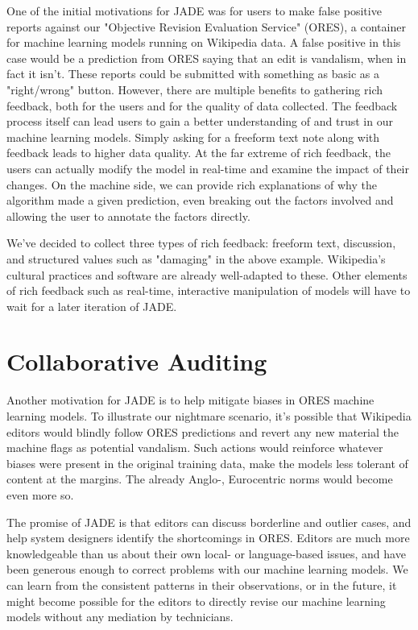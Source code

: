 \documentclass[sigconf, anonymous, review]{acmart}
\begin{document}
One of the initial motivations for JADE was for users to make false positive reports against our "Objective Revision Evaluation Service" (ORES), a container for machine learning models running on Wikipedia data.  A false positive in this case would be a prediction from ORES saying that an edit is vandalism, when in fact it isn't.  These reports could be submitted with something as basic as a "right/wrong" button.  However, there are multiple benefits to gathering rich feedback, both for the users and for the quality of data collected.  The feedback process itself can lead users to gain a better understanding of and trust in our machine learning models.  Simply asking for a freeform text note along with feedback leads to higher data quality.  At the far extreme of rich feedback, the users can actually modify the model in real-time and examine the impact of their changes.\cite{amershi2014power} \cite{stumpf2009interacting}  On the machine side, we can provide rich explanations of why the algorithm made a given prediction, even breaking out the factors involved and allowing the user to annotate the factors directly.

We've decided to collect three types of rich feedback: freeform text, discussion, and structured values such as "damaging" in the above example.  Wikipedia's cultural practices and software are already well-adapted to these.  Other elements of rich feedback such as real-time, interactive manipulation of models will have to wait for a later iteration of JADE.

\section{Collaborative Auditing}

Another motivation for JADE is to help mitigate biases in ORES machine learning models.  To illustrate our nightmare scenario, it's possible that Wikipedia editors would blindly follow ORES predictions and revert any new material the machine flags as potential vandalism.  Such actions would reinforce whatever biases were present in the original training data, make the models less tolerant of content at the margins.  The already Anglo-, Eurocentric norms\cite{ford2013getting} would become even more so.

The promise of JADE is that editors can discuss borderline and outlier cases, and help system designers identify the shortcomings in ORES.  Editors are much more knowledgeable than us about their own local- or language-based issues, and have been generous enough to correct problems with our machine learning models.  We can learn from the consistent patterns in their observations, or in the future, it might become possible for the editors to directly revise our machine learning models without any mediation by technicians.
\end{document}
